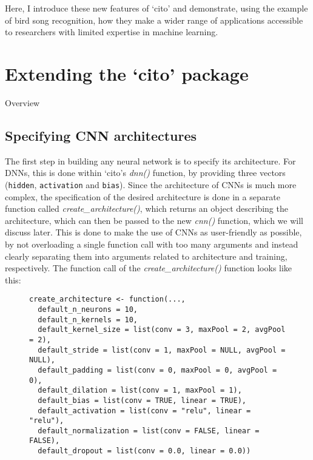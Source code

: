 \documentclass{article}
\newcommand{\pkg}[1]{`#1'}
\newcommand{\fn}[2][]{\textit{#2(}#1\textit{)}}
\newcommand{\val}[1]{\texttt{#1}}
\begin{document}
Here, I introduce these new features of \pkg{cito} and demonstrate, using the example of bird song recognition, how they make a wider range of applications accessible to researchers with limited expertise in machine learning.


\section{Extending the \pkg{cito} package}

Overview

\subsection{Specifying CNN architectures}


The first step in building any neural network is to specify its architecture. For DNNs, this is done within \pkg{cito}s \fn{dnn} function, by providing three vectors (\val{hidden}, \val{activation} and \val{bias}). Since the architecture of CNNs is much more complex, the specification of the desired architecture is done in a separate function called \fn{create\_architecture}, which returns an object describing the architecture, which can then be passed to the new \fn{cnn} function, which we will discuss later. This is done to make the use of CNNs as user-friendly as possible, by not overloading a single function call with too many arguments and instead clearly separating them into arguments related to architecture and training, respectively. The function call of the \fn{create\_architecture} function looks like this:

\begin{figure}[h]
	\centering
	\newsavebox{\lstbox} %
	\begin{lrbox}{\lstbox}
		\begin{lstlisting}
create_architecture <- function(...,
  default_n_neurons = 10,
  default_n_kernels = 10,
  default_kernel_size = list(conv = 3, maxPool = 2, avgPool = 2),
  default_stride = list(conv = 1, maxPool = NULL, avgPool = NULL),
  default_padding = list(conv = 0, maxPool = 0, avgPool = 0),
  default_dilation = list(conv = 1, maxPool = 1),
  default_bias = list(conv = TRUE, linear = TRUE),
  default_activation = list(conv = "relu", linear = "relu"),
  default_normalization = list(conv = FALSE, linear = FALSE),
  default_dropout = list(conv = 0.0, linear = 0.0))
		\end{lstlisting}
	\end{lrbox}
	\resizebox{\textwidth}{!}{\usebox{\lstbox}}
\end{figure}
\end{document}
